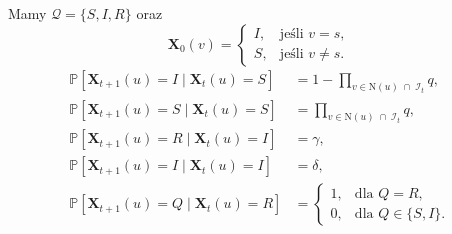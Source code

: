 Mamy $\mathcal{Q} = \{S, I, R\}$ oraz
\[
\mathbf{X}_0(v) =
\begin{cases}
I, & \text{jeśli } v = s, \\[4pt]
S, & \text{jeśli } v \neq s.
\end{cases}
\]
\[
\begin{aligned}
\mathbb{P}[\mathbf{X}_{t+1}(u) = I \mid \mathbf{X}_t(u) = S]
 &= 1 - \prod_{v \in \mathrm{N}(u) \;\cap\; \mathcal{I}_t} q, \\[6pt]
\mathbb{P}[\mathbf{X}_{t+1}(u) = S \mid \mathbf{X}_t(u) = S]
 &= \prod_{v \in \mathrm{N}(u) \;\cap\; \mathcal{I}_t} q, \\[6pt]
\mathbb{P}[\mathbf{X}_{t+1}(u) = R \mid \mathbf{X}_t(u) = I]
 &= \gamma, \\[6pt]
\mathbb{P}[\mathbf{X}_{t+1}(u) = I \mid \mathbf{X}_t(u) = I]
 &= \delta, \\[6pt]
\mathbb{P}[\mathbf{X}_{t+1}(u) = Q \mid \mathbf{X}_t(u) = R]
 &= 
\begin{cases}
1, & \text{dla } Q = R, \\[4pt]
0, & \text{dla } Q \in \{S, I\}.
\end{cases}
\end{aligned}
\]

